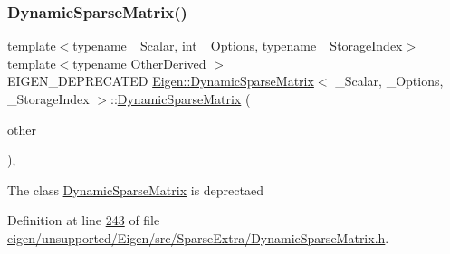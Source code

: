 \mbox{\label{class_eigen_1_1_dynamic_sparse_matrix_ab5bd886d79beb30802df0b1508727482}} 
\subsubsection{\texorpdfstring{Dynamic\+Sparse\+Matrix()}{DynamicSparseMatrix()}\hspace{0.1cm}{\footnotesize\ttfamily [3/6]}}
{\footnotesize\ttfamily template$<$typename \+\_\+\+Scalar, int \+\_\+\+Options, typename \+\_\+\+Storage\+Index$>$ \\
template$<$typename Other\+Derived $>$ \\
E\+I\+G\+E\+N\+\_\+\+D\+E\+P\+R\+E\+C\+A\+T\+ED \hyperlink{class_eigen_1_1_dynamic_sparse_matrix}{Eigen\+::\+Dynamic\+Sparse\+Matrix}$<$ \+\_\+\+Scalar, \+\_\+\+Options, \+\_\+\+Storage\+Index $>$\+::\hyperlink{class_eigen_1_1_dynamic_sparse_matrix}{Dynamic\+Sparse\+Matrix} (\begin{DoxyParamCaption}\item[{const \hyperlink{group___sparse_core___module_class_eigen_1_1_sparse_matrix_base}{Sparse\+Matrix\+Base}$<$ Other\+Derived $>$ \&}]{other }\end{DoxyParamCaption})\hspace{0.3cm}{\ttfamily [inline]}, {\ttfamily [explicit]}}

The class \hyperlink{class_eigen_1_1_dynamic_sparse_matrix}{Dynamic\+Sparse\+Matrix} is deprectaed 

Definition at line \hyperlink{eigen_2unsupported_2_eigen_2src_2_sparse_extra_2_dynamic_sparse_matrix_8h_source_l00243}{243} of file \hyperlink{eigen_2unsupported_2_eigen_2src_2_sparse_extra_2_dynamic_sparse_matrix_8h_source}{eigen/unsupported/\+Eigen/src/\+Sparse\+Extra/\+Dynamic\+Sparse\+Matrix.\+h}.

\mbox{\label{class_eigen_1_1_dynamic_sparse_matrix_af0677c8aec1e1dee9f0a389509082a83}} 
